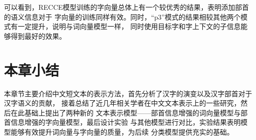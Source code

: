 \documentclass{standalone}
\begin{document}
可以看到，RECCE模型训练的字向量总体上有一个较优秀的结果，表明添加部首的语义信息对于
字向量的训练同样有效。同时，“p3”模式的结果相较其他两个模式有一定提升，说明与词向量模型一样，
同时使用目标字和字上下文的子信息能够得到最好的效果。
\section{本章小结}
本章节主要介绍中文短文本的表示方法，首先分析了汉字的演变以及汉字部首对于汉字语义的贡献，
接着总结了近几年相关学者在中文文本表示上的一些研究，然后在此基础上提出了两种新的
文本表示模型——部首信息增强的词向量模型与部首信息增强的字向量模型，最后设计实验
与其他模型进行对比，实验结果表明模型能够有效提升词向量与字向量的质量，为后续
分类模型提供充实的基础。
\end{document}
